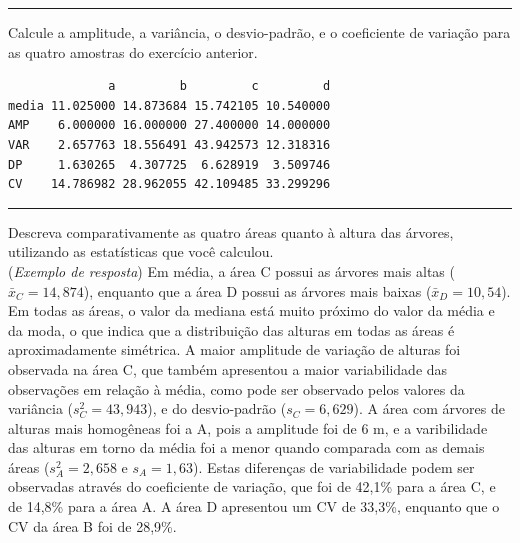 \documentclass[a4paper,11pt,fleqn]{article}\usepackage[]{graphicx}\usepackage[]{color}
\makeatletter
\newenvironment{kframe}{%
 \def\at@end@of@kframe{}%
 \ifinner\ifhmode%
  \def\at@end@of@kframe{\end{minipage}}%
  \begin{minipage}{\columnwidth}%
 \fi\fi%
 \def\FrameCommand##1{\hskip\@totalleftmargin \hskip-\fboxsep
 \colorbox{shadecolor}{##1}\hskip-\fboxsep
     \hskip-\linewidth \hskip-\@totalleftmargin \hskip\columnwidth}%
 \MakeFramed {\advance\hsize-\width
   \@totalleftmargin\z@ \linewidth\hsize
   \@setminipage}}%
 {\par\unskip\endMakeFramed%
 \at@end@of@kframe}
\newenvironment{knitrout}{}{} %
\theoremstyle{definition}
\makeatother
\begin{document}
\vspace{0.3cm}
\hrule
\vspace{0.3cm}

\begin{compactenum}[2.]
\item Calcule a amplitude, a variância, o desvio-padrão, e o coeficiente
  de variação para as quatro amostras do exercício anterior.
\begin{knitrout}\small
{}\color{fgcolor}\begin{kframe}
\begin{verbatim}
              a         b         c         d
media 11.025000 14.873684 15.742105 10.540000
AMP    6.000000 16.000000 27.400000 14.000000
VAR    2.657763 18.556491 43.942573 12.318316
DP     1.630265  4.307725  6.628919  3.509746
CV    14.786982 28.962055 42.109485 33.299296
\end{verbatim}
\end{kframe}
\end{knitrout}
\end{compactenum}

\vspace{0.3cm}
\hrule
\vspace{0.3cm}

\begin{compactenum}[3.]
\item Descreva comparativamente as quatro áreas quanto à altura das
  árvores, utilizando as estatísticas que você calculou.\\
  (\textit{Exemplo de resposta}) Em média, a área C possui as árvores
  mais altas ($\bar{x}_C = 14,874$), enquanto que a área D possui as
  árvores mais baixas ($\bar{x}_D = 10,54$). Em todas as áreas, o valor
  da mediana está muito próximo do valor da média e da moda, o que
  indica que a distribuição das alturas em todas as áreas é
  aproximadamente simétrica. A maior amplitude de variação de alturas
  foi observada na área C, que também apresentou a maior variabilidade
  das observações em relação à média, como pode ser observado pelos
  valores da variância ($s^2_C = 43,943$), e do desvio-padrão ($s_C =
  6,629$). A área com árvores de alturas mais homogêneas foi a A, pois a
  amplitude foi de 6 m, e a varibilidade das alturas em torno da média
  foi a menor quando comparada com as demais áreas ($s^2_A = 2,658$ e
  $s_A = 1,63$). Estas diferenças de variabilidade podem ser observadas
  através do coeficiente de variação, que foi de 42,1\% para a área C, e
  de 14,8\% para a área A. A área D apresentou um CV de 33,3\%, enquanto
  que o CV da área B foi de 28,9\%.
\end{compactenum}
\end{document}
